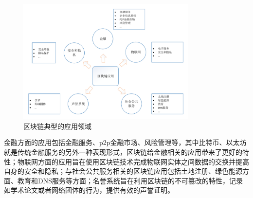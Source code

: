 \begin{figure}[htbp]
 	\centering
 	\includegraphics[width = 0.8\textwidth]{img/applications}
 	\caption{区块链典型的应用领域}\label{fig:applications}
\end{figure}

金融方面的应用包括金融服务、p2p金融市场、风险管理等，其中比特币、以太坊就是传统金融服务的另外一种表现形式，区块链给金融相关的应用带来了更好的特性；物联网方面的应用旨在使用区块链技术完成物联网实体之间数据的交换并提高自身的安全和隐私；与社会公共服务相关的区块链应用包括土地注册、绿色能源方面、教育和DNS服务等方面；名誉系统旨在利用区块链的不可篡改的特性，记录如学术论文或者网络团体的行为，提供有效的声誉证明。





















